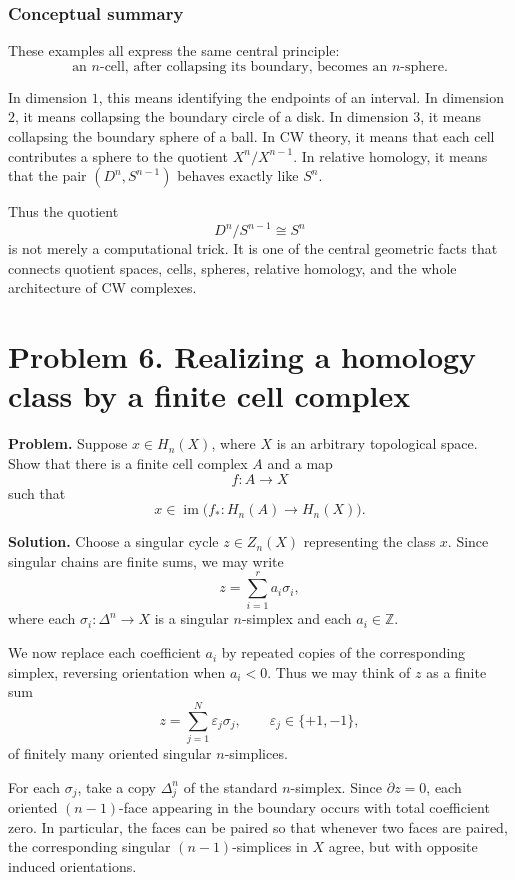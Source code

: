 \documentclass[12pt,a4paper]{article}
\theoremstyle{notespace}
\begin{document}
\subsubsection*{Conceptual summary}

These examples all express the same central principle:
\[
\boxed{\text{an \(n\)-cell, after collapsing its boundary, becomes an \(n\)-sphere}.}
\]

In dimension \(1\), this means identifying the endpoints of an interval. In dimension \(2\), it means collapsing the boundary circle of a disk. In dimension \(3\), it means collapsing the boundary sphere of a ball. In CW theory, it means that each cell contributes a sphere to the quotient \(X^n/X^{n-1}\). In relative homology, it means that the pair \((D^n,S^{n-1})\) behaves exactly like \(S^n\).

Thus the quotient
\[
D^n/S^{n-1}\cong S^n
\]
is not merely a computational trick. It is one of the central geometric facts that connects quotient spaces, cells, spheres, relative homology, and the whole architecture of CW complexes.

\section{Problem 6. Realizing a homology class by a finite cell complex}

\textbf{Problem.} Suppose \(x\in H_n(X)\), where \(X\) is an arbitrary topological space. Show that there is a finite cell complex \(A\) and a map
\[
f:A\to X
\]
such that
\[
x\in \operatorname{im}\bigl(f_*:H_n(A)\to H_n(X)\bigr).
\]

\medskip

\textbf{Solution.}
Choose a singular cycle \(z\in Z_n(X)\) representing the class \(x\). Since singular chains are finite sums, we may write
\[
z=\sum_{i=1}^r a_i\sigma_i,
\]
where each \(\sigma_i:\Delta^n\to X\) is a singular \(n\)-simplex and each \(a_i\in \mathbb Z\).

We now replace each coefficient \(a_i\) by repeated copies of the corresponding simplex, reversing orientation when \(a_i<0\). Thus we may think of \(z\) as a finite sum
\[
z=\sum_{j=1}^N \varepsilon_j \sigma_j,
\qquad \varepsilon_j\in\{+1,-1\},
\]
of finitely many oriented singular \(n\)-simplices.

For each \(\sigma_j\), take a copy \(\Delta_j^n\) of the standard \(n\)-simplex. Since \(\partial z=0\), each oriented \((n-1)\)-face appearing in the boundary occurs with total coefficient zero. In particular, the faces can be paired so that whenever two faces are paired, the corresponding singular \((n-1)\)-simplices in \(X\) agree, but with opposite induced orientations.
\end{document}
